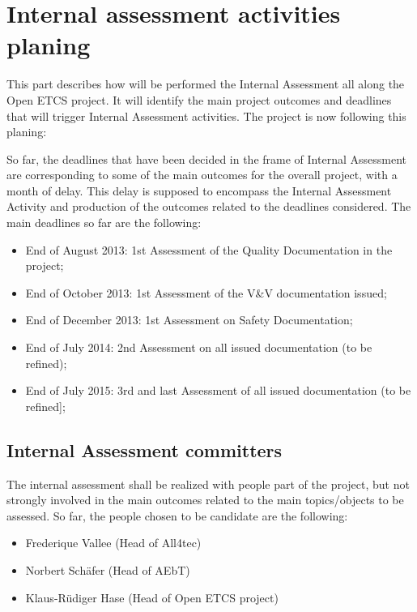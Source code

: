 \documentclass{template/openetcs_article}
\begin{document}
\section{Internal assessment activities planing}
This part describes how will be performed the Internal Assessment all along the Open ETCS project. It will identify the main project outcomes and deadlines that will trigger Internal Assessment activities.
The project is now following this planing:


So far, the deadlines that have been decided in the frame of Internal Assessment are corresponding to some of the main outcomes for the overall project, with a month of delay. This delay is supposed to encompass the Internal Assessment Activity and production of the outcomes related to the deadlines considered. The main deadlines so far are the following:
\begin{itemize}
\item End of August 2013: 1st Assessment of the Quality Documentation in the project;
\item End of October 2013: 1st Assessment of the V\&V documentation issued;
\item End of December 2013: 1st Assessment on Safety Documentation;
\item End of July 2014: 2nd Assessment on all issued documentation (to be refined);
\item End of July 2015: 3rd and last Assessment of all issued documentation (to be refined];
\end{itemize}

\subsection{Internal Assessment committers}
The internal assessment shall be realized with people part of the project, but not strongly involved in the main outcomes related to the main topics/objects to be assessed.
So far, the people chosen to be candidate are the following:
\begin{itemize}
\item Frederique Vallee (Head of All4tec)
\item Norbert Schäfer (Head of AEbT)
\item Klaus-Rüdiger Hase (Head of Open ETCS project)
\end{itemize}
\end{document}
